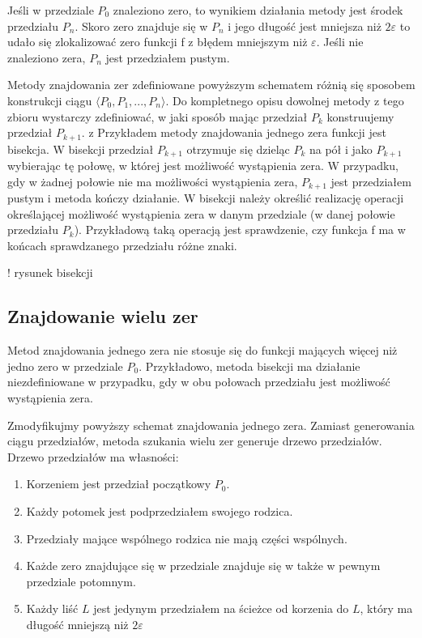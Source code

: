 \documentclass[11pt,a4paper,oneside]{report}
\begin{document}
Jeśli w przedziale $P_0$ znaleziono zero, to wynikiem działania metody jest środek przedziału $P_n$. Skoro zero znajduje się w $P_n$ i jego długość jest mniejsza niż $2 \varepsilon$ to udało się zlokalizować zero funkcji f z błędem mniejszym niż $\varepsilon$. Jeśli nie znaleziono zera, $P_n$ jest przedziałem pustym.

Metody znajdowania zer zdefiniowane powyższym schematem różnią się sposobem konstrukcji ciągu $\langle P_0, P_1, ..., P_n\rangle$. Do kompletnego opisu dowolnej metody z tego zbioru wystarczy zdefiniować, w jaki sposób mając przedział $P_k$ konstruujemy przedział $P_{k+1}$.
z
Przykładem metody znajdowania jednego zera funkcji jest bisekcja. W bisekcji przedział $P_{k+1}$ otrzymuje się dzieląc $P_k$ na pół i jako $P_{k+1}$ wybierając tę połowę, w której jest możliwość wystąpienia zera. W przypadku, gdy w żadnej połowie nie ma możliwości wystąpienia zera, $P_{k+1}$ jest przedziałem pustym i metoda kończy działanie. W bisekcji należy określić realizację operacji określającej możliwość wystąpienia zera w danym przedziale (w danej połowie przedziału $P_k$). Przykładową taką operacją jest sprawdzenie, czy funkcja f ma w końcach sprawdzanego przedziału różne znaki.

! rysunek bisekcji

\subsection{Znajdowanie wielu zer}

Metod znajdowania jednego zera nie stosuje się do funkcji mających więcej niż jedno zero w przedziale $P_0$. Przykładowo, metoda bisekcji ma działanie niezdefiniowane w przypadku, gdy w obu połowach przedziału jest możliwość wystąpienia zera.

Zmodyfikujmy powyższy schemat znajdowania jednego zera. Zamiast generowania ciągu przedziałów, metoda szukania wielu zer generuje drzewo przedziałów. Drzewo przedziałów ma własności:
\begin{enumerate}
\item Korzeniem jest przedział początkowy $P_0$.
\item Każdy potomek jest podprzedziałem swojego rodzica.
\item Przedziały mające wspólnego rodzica nie mają części wspólnych.
\item Każde zero znajdujące się w przedziale znajduje się w także w pewnym przedziale potomnym.
\item Każdy liść $L$ jest jedynym przedziałem na ścieżce od korzenia do $L$, który ma długość mniejszą niż $2 \varepsilon$
\end{enumerate}
\end{document}
